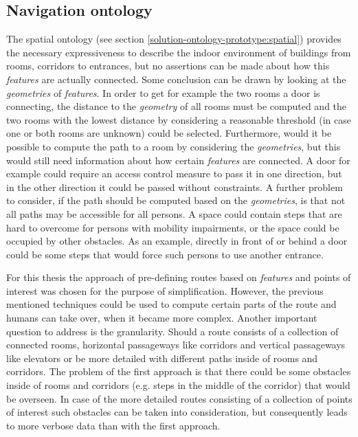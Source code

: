 \documentclass[draft,final]{vutinfth} %
\begin{document}
\subsection{Navigation ontology}
\label{solution-ontology-prototype:navigation}
The spatial ontology (see section \ref{solution-ontology-prototype:spatial}) provides the necessary expressiveness to describe the indoor environment of buildings from rooms, corridors to entrances, but no assertions can be made about how this \textit{features} are actually connected. Some conclusion can be drawn by looking at the \textit{geometries} of \textit{features}. In order to get for example the two rooms a door is connecting, the distance to the \textit{geometry} of all rooms must be computed and the two rooms with the lowest distance by considering a reasonable threshold (in case one or both rooms are unknown) could be selected. Furthermore, would it be possible to compute the path to a room by considering the \textit{geometries}, but this would still need information about how certain \textit{features} are connected. A door for example could require an access control measure to pass it in one direction, but in the other direction it could be passed without constraints. A further problem to consider, if the path should be computed based on the \textit{geometries}, is that not all paths may be accessible for all persons. A space could contain steps that are hard to overcome for persons with mobility impairments, or the space could be occupied by other obstacles.  As an example, directly in front of or behind a door could be some steps that would force such persons to use another entrance.

For this thesis the approach of pre-defining routes based on \textit{features} and points of interest was chosen for the purpose of simplification. However, the previous mentioned techniques could be used to compute certain parts of the route and humans can take over, when it became more complex. Another important question to address is the granularity. Should a route consists of a collection of connected rooms, horizontal passageways like corridors and vertical passageways like elevators or be more detailed with different paths inside of rooms and corridors. The problem of the first approach is that there could be some obstacles inside of rooms and corridors (e.g. steps in the middle of the corridor) that would be overseen. In case of the more detailed routes consisting of a collection of points of interest such obstacles can be taken into consideration, but consequently leads to more verbose data than with the first approach.
\end{document}
